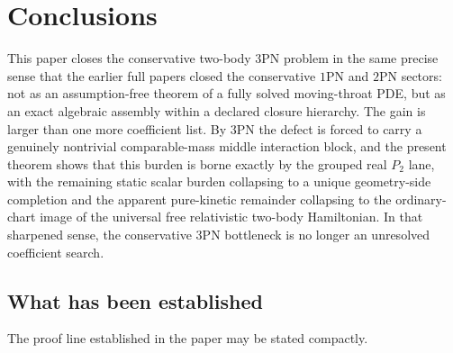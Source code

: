 \documentclass[11pt]{article}
\begin{document}
\section{Conclusions}
\label{sec:conclusions}

This paper closes the conservative two-body $3$PN problem in the same precise
sense that the earlier full papers closed the conservative $1$PN and $2$PN
sectors: not as an assumption-free theorem of a fully solved moving-throat PDE,
but as an exact algebraic assembly within a declared closure hierarchy.  The
gain is larger than one more coefficient list.  By $3$PN the defect is forced to
carry a genuinely nontrivial comparable-mass middle interaction block, and the
present theorem shows that this burden is borne exactly by the grouped real
$P_2$ lane, with the remaining static scalar burden collapsing to a unique
geometry-side completion and the apparent pure-kinetic remainder collapsing to
the ordinary-chart image of the universal free relativistic two-body
Hamiltonian.  In that sharpened sense, the conservative $3$PN bottleneck is no
longer an unresolved coefficient search.

\subsection{What has been established}
\label{sec:conclusions-established}

The proof line established in the paper may be stated compactly.
\end{document}
